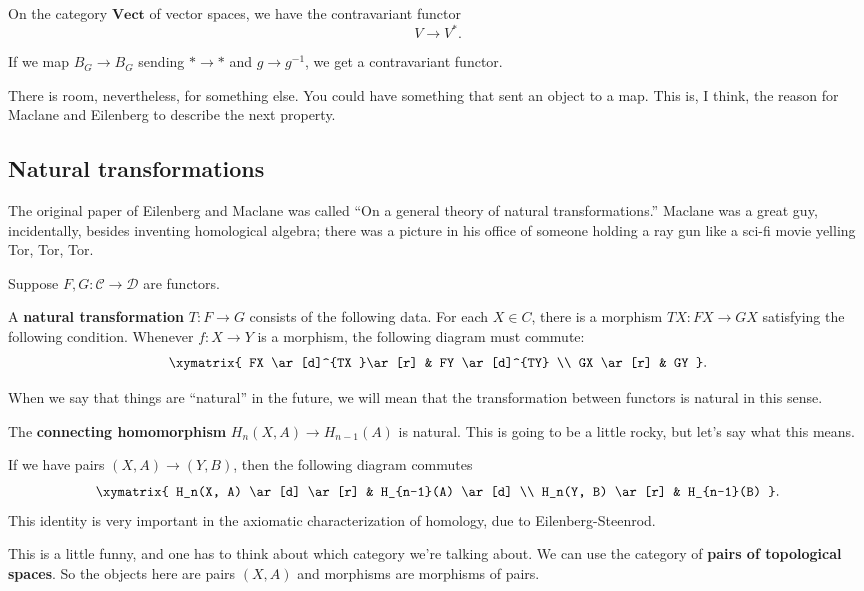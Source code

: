 \begin{example} 
On the category $\mathbf{Vect}$ of vector spaces, we have the contravariant
functor
\[ V \to V^{\ast}.  \]
\end{example} 

\begin{example} 
If we map $B_G \to B_G$ sending $\ast \to \ast$ and $g \to g^{-1}$, we get a
contravariant functor. 
\end{example} 

There is room, nevertheless, for something else. You could have something that
sent an object to a map. 
This is, I think, the reason for Maclane and Eilenberg to describe the next
property.

\subsection{Natural transformations}

The original paper of Eilenberg and Maclane was called ``On a general theory of
natural transformations.'' Maclane was a great guy, incidentally, besides
inventing homological algebra; there was a
picture in his office of someone holding a ray gun like a sci-fi movie yelling Tor, Tor, Tor. 


Suppose $F, G: \mathcal{C} \to \mathcal{D}$ are functors.

\begin{definition} 
A \textbf{natural transformation} $T: F \to G$ consists of the following data.
For each $X \in C$, there is a morphism $TX: FX \to GX$ satisfying the following
condition. Whenever $f: X \to Y$ is a morphism, the following diagram must
commute:
\[ \xymatrix{
FX \ar[d]^{TX }\ar[r] &  FY \ar[d]^{TY}  \\
GX \ar[r] &  GY
}.\]
\end{definition} 

When we say that things are ``natural'' in the future, we will mean that the
transformation between functors is natural in this sense. 

\begin{example} 
The \textbf{connecting homomorphism} $H_n(X, A) \to H_{n-1}(A)$ is  natural. This is going to be a little rocky, but let's say what this
means.

If we have pairs $(X, A) \to (Y, B)$, then the following diagram commutes
\[ \xymatrix{
H_n(X, A) \ar[d]  \ar[r] &  H_{n-1}(A) \ar[d] \\
H_n(Y, B) \ar[r] &  H_{n-1}(B)
}.\]
This identity is very important in the axiomatic characterization of homology,
due to Eilenberg-Steenrod. 

This is a little funny, and one has to think about which category we're talking
about. We can use the category of \textbf{pairs of topological spaces}. So the
objects here are pairs $(X, A)$ and morphisms are morphisms of pairs. 
\end{example} 

